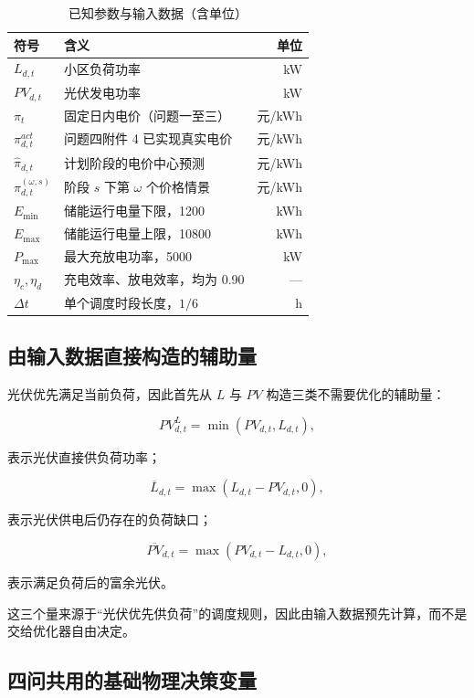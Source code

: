 \begin{table}[H]
\centering
{}
\begin{tabular}{llr}
\toprule
符号 & 含义 & 单位 \\
\midrule
\(L_{d,t}\) & 小区负荷功率 & kW \\
\(PV_{d,t}\) & 光伏发电功率 & kW \\
\(\pi_t\) & 固定日内电价（问题一至三） & 元/kWh \\
\(\pi^{act}_{d,t}\) & 问题四附件 4 已实现真实电价 & 元/kWh \\
\(\hat\pi_{d,t}\) & 计划阶段的电价中心预测 & 元/kWh \\
\(\pi^{(\omega,s)}_{d,t}\) & 阶段 \(s\) 下第 \(\omega\) 个价格情景 & 元/kWh \\
\(E_{\min}\) & 储能运行电量下限，1200 & kWh \\
\(E_{\max}\) & 储能运行电量上限，10800 & kWh \\
\(P_{\max}\) & 最大充放电功率，5000 & kW \\
\(\eta_c,\eta_d\) & 充电效率、放电效率，均为 0.90 & — \\
\(\Delta t\) & 单个调度时段长度，\(1/6\) & h \\
\bottomrule
\end{tabular}
\caption{已知参数与输入数据（含单位）}
\label{tab:2}
\end{table}

\subsection{由输入数据直接构造的辅助量}

光伏优先满足当前负荷，因此首先从 \(L\) 与 \(PV\) 构造三类不需要优化的辅助量：

\[
PV^L_{d,t}=\min(PV_{d,t},L_{d,t}),
\]

表示光伏直接供负荷功率；

\[
\overline L_{d,t}
=
\max(L_{d,t}-PV_{d,t},0),
\]

表示光伏供电后仍存在的负荷缺口；

\[
\overline{PV}_{d,t}
=
\max(PV_{d,t}-L_{d,t},0),
\]

表示满足负荷后的富余光伏。

这三个量来源于“光伏优先供负荷”的调度规则，因此由输入数据预先计算，而不是交给优化器自由决定。

\subsection{四问共用的基础物理决策变量}

